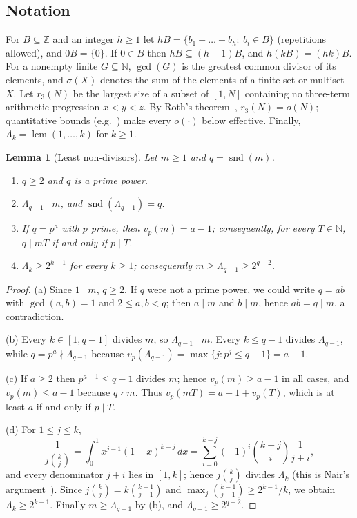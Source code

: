\documentclass[11pt,reqno]{amsart}
\numberwithin{equation}{section}
\newtheorem{lemma}[theorem]{Lemma}
\theoremstyle{definition}
\theoremstyle{remark}
\newcommand{\N}{\mathbb{N}}
\newcommand{\Z}{\mathbb{Z}}
\newcommand{\snd}{\operatorname{snd}}
\newcommand{\lcmop}{\operatorname{lcm}}
\begin{document}
\subsection{Notation}
For $B\subseteq\Z$ and an integer $h\ge1$ let $hB=\{b_1+\dots+b_h:\ b_i\in B\}$ (repetitions allowed), and $0B=\{0\}$. If $0\in B$ then $hB\subseteq(h+1)B$, and $h(kB)=(hk)B$. For a nonempty finite $G\subseteq\N$, $\gcd(G)$ is the greatest common divisor of its elements, and $\sigma(X)$ denotes the sum of the elements of a finite set or multiset $X$. Let $r_3(N)$ be the largest size of a subset of $[1,N]$ containing no three-term arithmetic progression $x<y<z$. By Roth's theorem~\cite{Ro53}, $r_3(N)=o(N)$; quantitative bounds (e.g.~\cite{KM23}) make every $o(\cdot)$ below effective. Finally, $\Lambda_k=\lcmop(1,\dots,k)$ for $k\ge1$.

\begin{lemma}[Least non-divisors]\label{lem:snd}
Let $m\ge1$ and $q=\snd(m)$.
\begin{enumerate}[label=\textup{(\alph*)}]
\item $q\ge2$ and $q$ is a prime power.
\item $\Lambda_{q-1}\mid m$, and $\snd(\Lambda_{q-1})=q$.
\item If $q=p^a$ with $p$ prime, then $v_p(m)=a-1$; consequently, for every $T\in\N$, $q\mid mT$ if and only if $p\mid T$.
\item $\Lambda_k\ge2^{k-1}$ for every $k\ge1$; consequently $m\ge\Lambda_{q-1}\ge2^{q-2}$.
\end{enumerate}
\end{lemma}

\begin{proof}
(a) Since $1\mid m$, $q\ge2$. If $q$ were not a prime power, we could write $q=ab$ with $\gcd(a,b)=1$ and $2\le a,b<q$; then $a\mid m$ and $b\mid m$, hence $ab=q\mid m$, a contradiction.

(b) Every $k\in[1,q-1]$ divides $m$, so $\Lambda_{q-1}\mid m$. Every $k\le q-1$ divides $\Lambda_{q-1}$, while $q=p^a\nmid\Lambda_{q-1}$ because $v_p(\Lambda_{q-1})=\max\{j:p^j\le q-1\}=a-1$.

(c) If $a\ge2$ then $p^{a-1}\le q-1$ divides $m$; hence $v_p(m)\ge a-1$ in all cases, and $v_p(m)\le a-1$ because $q\nmid m$. Thus $v_p(mT)=a-1+v_p(T)$, which is at least $a$ if and only if $p\mid T$.

(d) For $1\le j\le k$,
\[
 \frac1{j\binom kj}=\int_0^1x^{j-1}(1-x)^{k-j}\,dx=\sum_{i=0}^{k-j}(-1)^i\binom{k-j}{i}\frac1{j+i},
\]
and every denominator $j+i$ lies in $[1,k]$; hence $j\binom kj$ divides $\Lambda_k$ (this is Nair's argument~\cite{Na82}). Since $j\binom kj=k\binom{k-1}{j-1}$ and $\max_j\binom{k-1}{j-1}\ge2^{k-1}/k$, we obtain $\Lambda_k\ge2^{k-1}$. Finally $m\ge\Lambda_{q-1}$ by (b), and $\Lambda_{q-1}\ge2^{q-2}$.
\end{proof}
\end{document}
